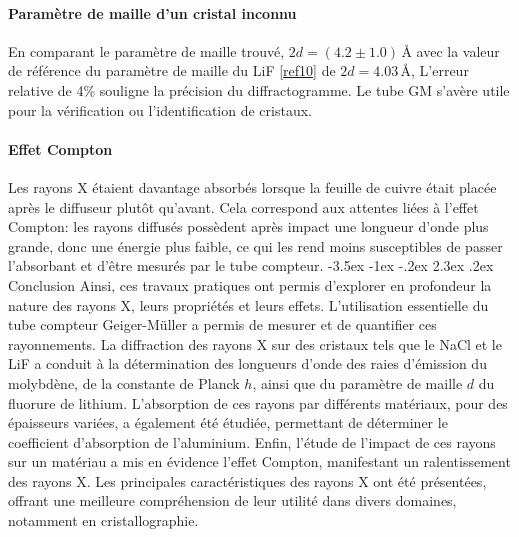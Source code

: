 \documentclass[a4paper, 12pt,oneside]{article}
\makeatletter
\renewcommand{\section}{\@startsection {section}{1}{\z@}%
             {-3.5ex \@plus -1ex \@minus -.2ex}%
             {2.3ex \@plus.2ex}%
             {\normalfont\normalsize\bfseries}}
\makeatother
\begin{document}
\paragraph{Paramètre de maille d’un cristal inconnu}
En comparant le paramètre de maille trouvé, $2d=(4.2\pm1.0)$\,Å avec la valeur de référence du paramètre de maille du LiF \ref{ref10} de $2d=4.03$\,Å, L’erreur relative de 4\% souligne la précision du diffractogramme. Le tube GM s'avère utile pour la vérification ou l'identification de cristaux.
\vspace{-0.35cm}
\paragraph{Effet Compton}
Les rayons X étaient davantage absorbés lorsque la feuille de cuivre était placée après le diffuseur plutôt qu'avant. Cela correspond aux attentes liées à l'effet Compton: les rayons diffusés possèdent après impact une longueur d'onde plus grande, donc une énergie plus faible, ce qui les rend moins susceptibles de passer l’absorbant et d’être mesurés par le tube compteur.
\vspace{-0.3cm}
\section{Conclusion}
\vspace{-0.2cm}
Ainsi, ces travaux pratiques ont permis d'explorer en profondeur la nature des rayons X, leurs propriétés et leurs effets. L'utilisation essentielle du tube compteur Geiger-Müller a permis de mesurer et de quantifier ces rayonnements. La diffraction des rayons X sur des cristaux tels que le NaCl et le LiF a conduit à la détermination des longueurs d'onde des raies d'émission du molybdène, de la constante de Planck $h$, ainsi que du paramètre de maille $d$ du fluorure de lithium. L'absorption de ces rayons par différents matériaux, pour des épaisseurs variées, a également été étudiée, permettant de déterminer le coefficient d'absorption de l'aluminium. Enfin, l'étude de l'impact de ces rayons sur un matériau a mis en évidence l'effet Compton, manifestant un ralentissement des rayons X. Les principales caractéristiques des rayons X ont été présentées, offrant une meilleure compréhension de leur utilité dans divers domaines, notamment en cristallographie.

 
\end{document}
